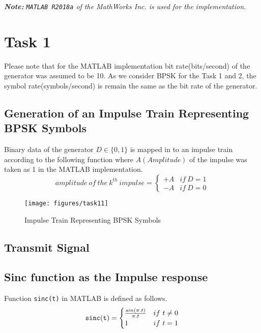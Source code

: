 \documentclass[a4paper,11pt]{article}%
\begin{document}


\tableofcontents
\vfill


\begin{center}
	\textit{\textbf{Note:}}
\textit{{\tt MATLAB R2018a} of the MathWorks Inc. is used for the implementation.}
\end{center}
\pagebreak

\section{Task 1}

Please note that for the MATLAB implementation bit rate(bits/second) of the generator was assumed to be 10. As we consider BPSK for the Task 1 and 2, the symbol rate(symbols/second) is remain the same as the bit rate of the generator.

\subsection{Generation of an Impulse Train Representing BPSK Symbols}
Binary data of the generator $D \in \{0, 1\}$ is mapped in to an impulse train according to the following function where $A(Amplitude)$  of the impulse was taken as 1 in the MATLAB implementation.
\[
amplitude ~of~ the~ k^{th}~ impulse = \begin{cases}
	+A & if~ D = 1\\
	-A & if~ D = 0
\end{cases}
\]

\begin{figure}[H]
	\centering
	\texttt{[image: figures/task11]}
	\caption{Impulse Train Representing BPSK Symbols}
\end{figure}

\subsection{Transmit Signal}
\subsection{Sinc function as the Impulse response}

Function {\tt sinc(t)} in MATLAB is defined as follows. 
\[
{\tt sinc(t)} = \begin{cases}
	\frac{sin(\pi.t)}{\pi.t} & if~t \neq 0\\
	1 & if~ t = 1
\end{cases}
\]
\end{document}
